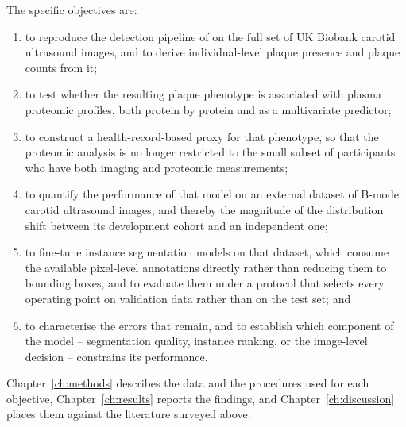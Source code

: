 The specific objectives are:

\begin{enumerate}[nosep]
  \item to reproduce the detection pipeline of \textcite{omarov2024deep} on the full set of
        UK Biobank carotid ultrasound images, and to derive individual-level plaque presence
        and plaque counts from it;
  \item to test whether the resulting plaque phenotype is associated with plasma proteomic
        profiles, both protein by protein and as a multivariate predictor;
  \item to construct a health-record-based proxy for that phenotype, so that the proteomic
        analysis is no longer restricted to the small subset of participants who have both
        imaging and proteomic measurements;
  \item to quantify the performance of that model on an external dataset of B-mode carotid
        ultrasound images, and thereby the magnitude of the distribution shift between its
        development cohort and an independent one;
  \item to fine-tune instance segmentation models on that dataset, which consume the available
        pixel-level annotations directly rather than reducing them to bounding boxes, and to
        evaluate them under a protocol that selects every operating point on validation data
        rather than on the test set; and
  \item to characterise the errors that remain, and to establish which component of the model --
        segmentation quality, instance ranking, or the image-level decision -- constrains its
        performance.
\end{enumerate}

Chapter~\ref{ch:methods} describes the data and the procedures used for each objective,
Chapter~\ref{ch:results} reports the findings, and Chapter~\ref{ch:discussion} places them
against the literature surveyed above.
